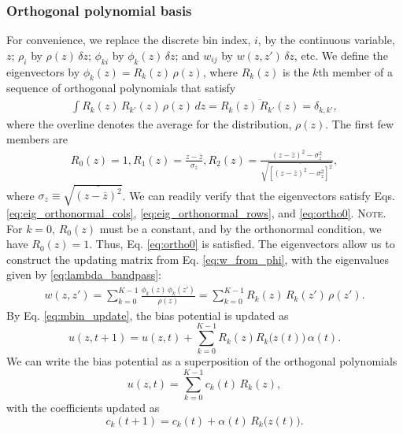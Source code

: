 \documentclass[reprint, superscriptaddress, floatfix]{revtex4-1}
\newcommand{\note}[1]{{\color{DarkGreen}\footnotesize \textsc{Note.} #1}}
\begin{document}
\subsubsection{Orthogonal polynomial basis}

For convenience, we
replace the discrete bin index, $i$,
by the continuous variable, $z$;
%
$\rho_i$ by $\rho(z) \, \delta z$;
$\phi_{ki}$ by $\phi_k(z) \, \delta z$;
and
$w_{ij}$ by $w(z, z') \, \delta z$, etc.
%
We define the eigenvectors by
$\phi_k(z) = R_k(z) \, \rho(z)$,
where $R_k(z)$ is the $k$th member of a sequence of orthogonal polynomials
that satisfy
\begin{align*}
  \int R_k(z) \, R_{k'}(z) \, \rho(z) \, d z
  = \overline{ R_k(z) \, R_{k'}(z) }
  = \delta_{k, k'}
  ,
\end{align*}
%
where the overline denotes the average for the distribution, $\rho(z)$.
%
The first few members are
\begin{align*}
  R_0(z) = 1,
  R_1(z) = \frac{z - \overline{z}}{\sigma_z},
  R_2(z) = \frac{ (z - \overline{z})^2 - \sigma_z^2 }
  {\sqrt{\overline{\left[
    (z - \overline z)^2 - \sigma_z^2
  \right]^2 }}}
  ,
\end{align*}
%
where $\sigma_z \equiv \sqrt{\overline{\left(z - \overline z\right)^2}}$.
%
We can readily verify that the eigenvectors satisfy
Eqs. \eqref{eq:eig_orthonormal_cols}, \eqref{eq:eig_orthonormal_rows},
and \eqref{eq:ortho0}.
%
\note{For $k = 0$, $R_0(z)$ must be a constant,
  and by the orthonormal condition, we have $R_0(z) = 1$.
  Thus, Eq. \eqref{eq:ortho0} is satisfied.}%
%
The eigenvectors allow us to construct the updating matrix
from Eq. \eqref{eq:w_from_phi},
with the eigenvalues given by \eqref{eq:lambda_bandpass}:
\begin{align*}
  w(z, z')
  =
  \sum_{k=0}^{K-1} \frac{ \phi_k(z) \, \phi_k(z') } { \rho(z) }
  =
  \sum_{k=0}^{K-1} R_k(z) \, R_k(z') \, \rho(z')
  .
\end{align*}
%
%
By Eq. \eqref{eq:mbin_update},
the bias potential is updated as
%
$$
u(z, t+1) = u(z, t)
+ \sum_{k=0}^{K-1} R_k(z) R_k\bigl( z(t) \bigr) \, \alpha(t).
$$
%
We can write the bias potential
as a superposition of the orthogonal polynomials
%
\begin{equation}
  u(z, t) = \sum_{k=0}^{K-1} c_k(t) \, R_k(z),
  \label{eq:uz_decomp}
\end{equation}
%
with the coefficients updated as
%
\begin{equation}
  c_k(t+1) = c_k(t) + \alpha(t) \, R_k\bigl( z(t) \bigr)
  .
  \label{eq:ckupdate}
\end{equation}
\end{document}
